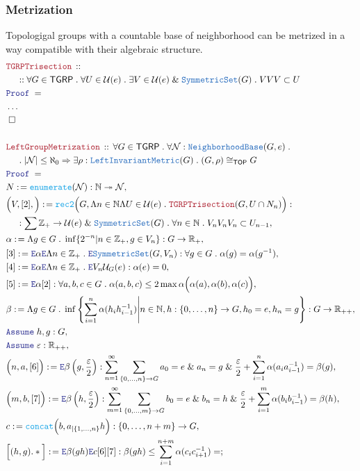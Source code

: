 \documentclass[12pt]{scrartcl}
\newcommand{\TYPE}[1]{\textcolor{NavyBlue}{\mathtt{#1}}}
\newcommand{\FUNC}[1]{\textcolor{Cerulean}{\mathtt{#1}}}
\newcommand{\LOGIC}[1]{\textcolor{Blue}{\mathtt{#1}}}
\newcommand{\THM}[1]{\textcolor{Maroon}{\mathtt{#1}}}
\renewcommand{\.}{\; . \;}
\newcommand{\de}{: \kern 0.1pc =}
\newcommand{\Theorem}[2]{& \THM{#1} \, :: \, #2 \\ & \Proof = \\ }
\newcommand{\NewLine}{\\ & \kern 1pc}
\newcommand{\Page}[1]{ \begin{align*} #1 \end{align*}   }
\newcommand{\NoProof}{ & \ldots \\ \EndProof}
\renewcommand{\And}{\; \& \;}
\newcommand{\Imply}{\Rightarrow}
\newcommand{\Int}{\mathbb{Z} }
\newcommand{\Reals}{\mathbb{R} }
\newcommand{\Nat}{\mathbb{N} }
\newcommand{\ToSurj}{\twoheadrightarrow}
\newcommand{\Say}[3]{& #1 \de #2 : #3, \\}
\newcommand{\Conclude}[3]{& #1 \de #2 : #3; \\}
\newcommand{\Assume}[2]{& \LOGIC{Assume} \; #1 : #2, \\}
\newcommand{\Elim}{\LOGIC{E}}
\newcommand{\QED}{\; \square}
\newcommand{\EndProof}{& \QED \\}
\newcommand{\Proof}{\LOGIC{Proof} \; }
\newcommand{\NbhdBase}{\TYPE{NeighborhoodBase}}
\newcommand{\TOP}{\mathsf{TOP}}
\renewcommand{\U}{\mathcal{U}}
\newcommand{\LIM}{\TYPE{LeftInvariantMetric}}
\renewcommand{\SS}{\TYPE{SymmetricSet}}
\newcommand{\TGRP}{\mathsf{TGRP}}
\begin{document}
\subsubsection{Metrization}
Topologigal groups with a countable base of neighborhood can be metrized in a way compatible with their algebraic structure.
\Page{
		\Theorem{TGRPTrisection}
		{
			\NewLine ::			
			\forall G \in \TGRP \.
			\forall U \in \U(e) \.
			\exists V \in \U(e) \And \SS(G) \.
			VVV \subset U
		}		
		\NoProof
		\\
		\Theorem{LeftGroupMetrization}
		{			
			\forall G \in \TGRP \.
			\forall  \mathcal{N} : \NbhdBase(G,e) \. \NewLine \.
			|\mathcal{N}| \le \aleph_0 \Imply  
			\exists \rho : \LIM(G) \. (G,\rho) \cong_\TOP G 
		}
		\Say{N}{\FUNC{enumerate}(\mathcal{N})}
		{
			\Nat \ToSurj \mathcal{N}
		}
		\Say{\Big( V,[2], \Big)}
		{ 
			\FUNC{rec2}\Big( 
				G, 
				\Lambda n \in \Nat
				\Lambda U \in \U(e) \.
				\THM{TGRPTrisection}(G,U \cap N_n)  
			\Big)  
		}
		{
			\NewLine :			
			\sum \Int_+ \to \U(e) \And \SS(G) \. 
			\forall n \in \Nat \.   V_n V_n V_n \subset U_{n-1}
		}
		\Say{\alpha}
		{
			\Lambda g \in G \. \inf\{ 2^{-n}  | n \in \Int_+ , g \in V_n \}
		}
		{
			G \to \Reals_+
		}
		\Say{[3]}{\Elim \alpha \Elim \Lambda n \in \Int_+ \.  \Elim\SS(G,V_n)}
		{
			\forall g \in G \. \alpha(g) = \alpha(g^{-1})
		}
		\Say{[4]}{\Elim \alpha \Elim \Lambda n \in \Int_+ \. \Elim V_n \U_G(e)}
		{
			\alpha(e) = 0
		}
		\Say{[5]}{\Elim \alpha [2]}
		{
			\forall a,b,c \in G \.
			\alpha(a,b,c) \le 2\max\alpha\Big(\alpha(a),\alpha(b),\alpha(c)\Big)
		}
		\Say{\beta}
		{
			\Lambda g \in G \. 
			\inf \left\{    
				\sum^n_{i=1} \alpha(h_ih^{-1}_{i-1}) \Bigg|
				n \in \Nat, h : \{0,\ldots,n\} \to G , h_0 = e, h_n = g  			
			\right\}      
		}
		{
			G \to \Reals_{++}
		}
		\Assume{h,g}{G}
		\Assume{\varepsilon}{\Reals_{++}}
		\Say{\Big(n,a,[6]\Big)}
		{
			\Elim \beta\left(g,\frac{\varepsilon}{2}\right)
		}
		{
			\sum^\infty_{n=1} \sum_{ \{0,\ldots,n\} \to G }
			a_0 = e \And
			a_n = g \And
			\frac{\varepsilon}{2} + \sum^n_{i=1} \alpha(a_ia^{-1}_{i-1}) = \beta(g)
		}
		\Say{\Big(m,b,[7]\Big)}
		{
			\Elim \beta\left(h,\frac{\varepsilon}{2}\right)
		}
		{
			\sum^\infty_{m=1} \sum_{ \{0,\ldots,m\} \to G }
			b_0 = e \And
			b_n = h \And
			\frac{\varepsilon}{2} + \sum^m_{i=1} \alpha(b_ib^{-1}_{i-1}) = \beta(h)
		}
		\Say{c}{\FUNC{concat}\Big(b, a_{|\{1,\ldots,n\}}h \Big)}
		{
			\{0,\ldots,n+m\} \to G
		}
		\Conclude{\Big[(h,g).*\Big]}{\Elim \beta(gh) \Elim c [6][7]}
		{
			\beta(gh) \le 
			\sum^{n+m}_{i=1} \alpha(c_ic^{-1}_{i+1}) =
}}
\end{document}
